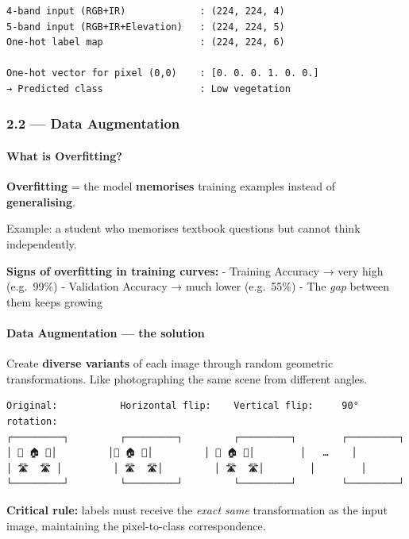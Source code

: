\documentclass[11pt]{article}
\begin{document}
    \begin{Verbatim}[commandchars=\\\{\}]
4-band input (RGB+IR)             : (224, 224, 4)
5-band input (RGB+IR+Elevation)   : (224, 224, 5)
One-hot label map                 : (224, 224, 6)

One-hot vector for pixel (0,0)    : [0. 0. 0. 1. 0. 0.]
→ Predicted class                 : Low vegetation
    \end{Verbatim}

    \subsubsection{2.2 --- Data Augmentation}\label{data-augmentation}

\paragraph{What is Overfitting?}\label{what-is-overfitting}

\textbf{Overfitting} = the model \textbf{memorises} training examples
instead of \textbf{generalising}.

Example: a student who memorises textbook questions but cannot think
independently.

\textbf{Signs of overfitting in training curves:} - Training Accuracy →
very high (e.g.~99\%) - Validation Accuracy → much lower (e.g.~55\%) -
The \emph{gap} between them keeps growing

\paragraph{Data Augmentation --- the
solution}\label{data-augmentation-the-solution}

Create \textbf{diverse variants} of each image through random geometric
transformations. Like photographing the same scene from different
angles.

\begin{verbatim}
Original:           Horizontal flip:    Vertical flip:     90° rotation:
┌─────────┐         ┌─────────┐         ┌─────────┐        ┌─────────┐
│ 🌳 🏠 🚗│         │🚗 🏠 🌳│         │ 🚗 🏠 🌳│        │   …    │
│ 🛣️  🛣️ │         │ 🛣️  🛣️│         │ 🛣️  🛣️│        │        │
└─────────┘         └─────────┘         └─────────┘        └─────────┘
\end{verbatim}

\textbf{Critical rule:} labels must receive the \emph{exact same}
transformation as the input image, maintaining the pixel-to-class
correspondence.
\end{document}
